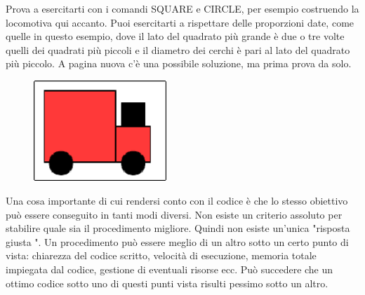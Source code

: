 \vskip 1cm

\begin{minipage}{0.40\textwidth}
Prova a esercitarti con i comandi SQUARE e CIRCLE, per esempio costruendo la locomotiva qui accanto. Puoi esercitarti a rispettare delle proporzioni date, come quelle in questo esempio, dove il lato del quadrato più grande è due o tre volte quelli dei quadrati più piccoli e il diametro dei cerchi è pari al lato del quadrato più piccolo. A pagina nuova c'è una possibile soluzione, ma prima prova da solo. 
\end{minipage}
\begin{minipage}{0.4\textwidth}
\begin{figure}[H]
   \includegraphics[width=5.0cm,trim=4 4 8 4,clip]{./images/disegnare/disegnare-21.png}
   \label{dis-20}
\end{figure}
\end{minipage} \hfill

\vskip 1cm

Una cosa importante di cui rendersi conto con il codice è che lo stesso obiettivo può essere conseguito in tanti modi diversi. Non esiste un criterio assoluto per stabilire quale sia il procedimento migliore. Quindi non esiste un'unica  "risposta giusta ". Un procedimento può essere meglio di un altro sotto un certo punto di vista: chiarezza del codice scritto, velocità di esecuzione, memoria totale impiegata dal codice, gestione di eventuali risorse ecc. Può succedere che un ottimo codice sotto uno di questi punti vista risulti pessimo sotto un altro.  

\newpage

